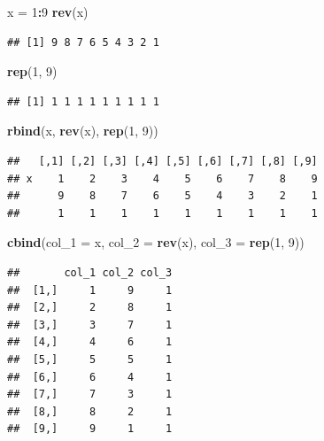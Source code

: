 \documentclass[]{book}
\newenvironment{Shaded}{\begin{snugshade}}{\end{snugshade}}
\newcommand{\KeywordTok}[1]{\textcolor[rgb]{0.13,0.29,0.53}{\textbf{#1}}}
\newcommand{\DataTypeTok}[1]{\textcolor[rgb]{0.13,0.29,0.53}{#1}}
\newcommand{\DecValTok}[1]{\textcolor[rgb]{0.00,0.00,0.81}{#1}}
\newcommand{\StringTok}[1]{\textcolor[rgb]{0.31,0.60,0.02}{#1}}
\newcommand{\OperatorTok}[1]{\textcolor[rgb]{0.81,0.36,0.00}{\textbf{#1}}}
\newcommand{\NormalTok}[1]{#1}
\theoremstyle{definition}
\theoremstyle{definition}
\theoremstyle{definition}
\theoremstyle{remark}
\begin{document}
\begin{Shaded}
\begin{Highlighting}[]
\NormalTok{x =}\StringTok{ }\DecValTok{1}\OperatorTok{:}\DecValTok{9}
\KeywordTok{rev}\NormalTok{(x)}
\end{Highlighting}
\end{Shaded}

\begin{verbatim}
## [1] 9 8 7 6 5 4 3 2 1
\end{verbatim}

\begin{Shaded}
\begin{Highlighting}[]
\KeywordTok{rep}\NormalTok{(}\DecValTok{1}\NormalTok{, }\DecValTok{9}\NormalTok{)}
\end{Highlighting}
\end{Shaded}

\begin{verbatim}
## [1] 1 1 1 1 1 1 1 1 1
\end{verbatim}

\begin{Shaded}
\begin{Highlighting}[]
\KeywordTok{rbind}\NormalTok{(x, }\KeywordTok{rev}\NormalTok{(x), }\KeywordTok{rep}\NormalTok{(}\DecValTok{1}\NormalTok{, }\DecValTok{9}\NormalTok{))}
\end{Highlighting}
\end{Shaded}

\begin{verbatim}
##   [,1] [,2] [,3] [,4] [,5] [,6] [,7] [,8] [,9]
## x    1    2    3    4    5    6    7    8    9
##      9    8    7    6    5    4    3    2    1
##      1    1    1    1    1    1    1    1    1
\end{verbatim}

\begin{Shaded}
\begin{Highlighting}[]
\KeywordTok{cbind}\NormalTok{(}\DataTypeTok{col_1 =}\NormalTok{ x, }\DataTypeTok{col_2 =} \KeywordTok{rev}\NormalTok{(x), }\DataTypeTok{col_3 =} \KeywordTok{rep}\NormalTok{(}\DecValTok{1}\NormalTok{, }\DecValTok{9}\NormalTok{))}
\end{Highlighting}
\end{Shaded}

\begin{verbatim}
##       col_1 col_2 col_3
##  [1,]     1     9     1
##  [2,]     2     8     1
##  [3,]     3     7     1
##  [4,]     4     6     1
##  [5,]     5     5     1
##  [6,]     6     4     1
##  [7,]     7     3     1
##  [8,]     8     2     1
##  [9,]     9     1     1
\end{verbatim}
\end{document}
